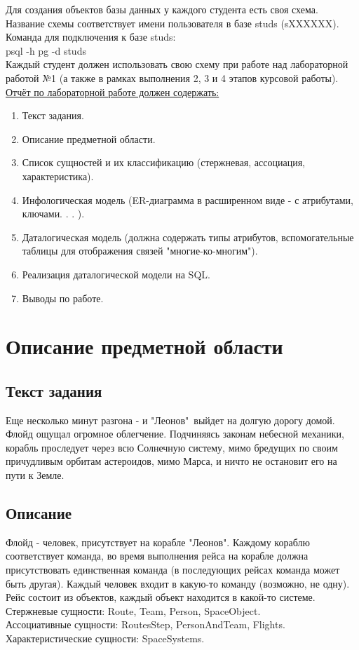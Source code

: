 \noindent Для создания объектов базы данных у каждого студента есть своя схема. Название схемы соответствует имени пользователя в базе studs (sXXXXXX). Команда для подключения к базе studs: \\

\noindent psql -h pg -d studs \\

\noindent Каждый студент должен использовать свою схему при работе над лабораторной работой №1 (а также
в рамках выполнения 2, 3 и 4 этапов курсовой работы). \\

\noindent \underline{Отчёт по лабораторной работе должен содержать:} 
\begin{enumerate}
    \item Текст задания.
    \item Описание предметной области.
    \item Список сущностей и их классификацию (стержневая, ассоциация, характеристика).
    \item Инфологическая модель (ER-диаграмма в расширенном виде - с атрибутами, ключами. . . ).
    \item Даталогическая модель (должна содержать типы атрибутов, вспомогательные таблицы для отображения связей "многие-ко-многим").
    \item Реализация даталогической модели на SQL.
    \item Выводы по работе.
\end{enumerate}
\section{Описание предметной области}
\subsection{Текст задания}
Еще несколько минут разгона - и "Леонов"\, выйдет на долгую дорогу домой. Флойд ощущал огромное облегчение. Подчиняясь законам небесной механики, корабль проследует через всю Солнечную систему, мимо бредущих по своим причудливым орбитам астероидов, мимо Марса, и ничто не остановит его на пути к Земле.
\subsection{Описание}
Флойд - человек, присутствует на корабле "Леонов". Каждому кораблю соответствует команда, во время выполнения рейса на корабле должна присутствовать единственная команда (в последующих рейсах команда может быть другая). Каждый человек входит в какую-то команду (возможно, не одну). Рейс состоит из объектов, каждый объект находится в какой-то системе. \\
Стержневые сущности: Route, Team, Person, SpaceObject. \\
Ассоциативные сущности: RoutesStep, PersonAndTeam, Flights. \\
Характеристические сущности: SpaceSystems.\\
\newpage
